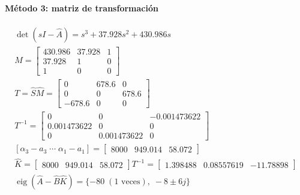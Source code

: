 \documentclass[11pt]{article}
\begin{document}
\paragraph{Método 3: matriz de transformación}
\begin{gather*}
\det(sI-\hat A)=s^{3} + 37.928s^{2} + 430.986s\\
\hat M=\begin{bmatrix}430.986 & 37.928 & 1 \\ 37.928 & 1 & 0 \\ 1 & 0 & 0\end{bmatrix}\\
T=\hat S\hat M=\begin{bmatrix}0 & 678.6 & 0 \\ 0 & 0 & 678.6 \\ -678.6 & 0 & 0\end{bmatrix}\\
T^{-1}=\begin{bmatrix}0 & 0 & -0.001473622 \\ 0.001473622 & 0 & 0 \\ 0 & 0.001473622 & 0\end{bmatrix}\\
[\alpha_3-a_3\;\cdots\;\alpha_1-a_1]=\begin{bmatrix}8000 & 949.014 & 58.072\end{bmatrix}\\
\hat K=\begin{bmatrix}8000 & 949.014 & 58.072\end{bmatrix}T^{-1}=\begin{bmatrix}1.398488 & 0.08557619 & -11.78898\end{bmatrix}\\
\operatorname{eig}(\hat A-\hat B\hat K)=\{-80\;(1\text{ veces}),\;-8\pm 6j\}
\end{gather*}
\end{document}

